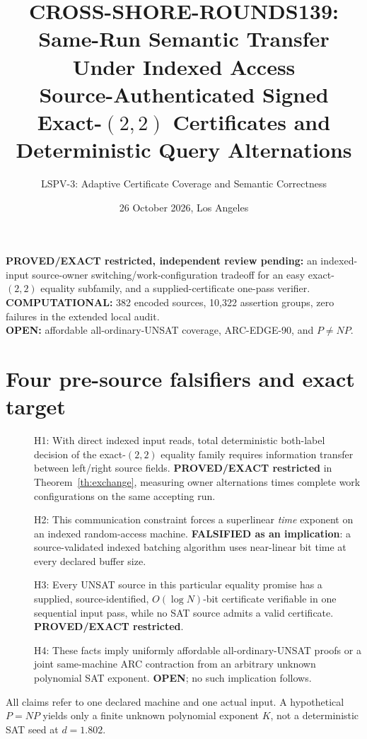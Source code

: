\documentclass[11pt]{article}
\title{CROSS-SHORE-ROUNDS139: Same-Run Semantic Transfer Under Indexed Access\\
\large Source-Authenticated Signed Exact-$(2,2)$ Certificates and Deterministic Query Alternations}
\author{LSPV-3: Adaptive Certificate Coverage and Semantic Correctness}
\date{26 October 2026, Los Angeles}
\begin{document}
\maketitle
\begin{center}
\textbf{PROVED/EXACT restricted, independent review pending:} an indexed-input source-owner switching/work-configuration tradeoff for an easy exact-$(2,2)$ equality subfamily, and a supplied-certificate one-pass verifier.\\
\textbf{COMPUTATIONAL:} 382 encoded sources, 10,322 assertion groups, zero failures in the extended local audit.\\
\textbf{OPEN:} affordable all-ordinary-UNSAT coverage, ARC-EDGE-90, and $P\ne NP$.
\end{center}
\section{Four pre-source falsifiers and exact target}
\begin{description}
\item[] H1: With direct indexed input reads, total deterministic both-label decision of the exact-$(2,2)$ equality family requires information transfer between left/right source fields. \textbf{PROVED/EXACT restricted} in Theorem~\ref{th:exchange}, measuring owner alternations times complete work configurations on the same accepting run.
\item[] H2: This communication constraint forces a superlinear \emph{time} exponent on an indexed random-access machine. \textbf{FALSIFIED as an implication}: a source-validated indexed batching algorithm uses near-linear bit time at every declared buffer size.
\item[] H3: Every UNSAT source in this particular equality promise has a supplied, source-identified, $O(\log N)$-bit certificate verifiable in one sequential input pass, while no SAT source admits a valid certificate. \textbf{PROVED/EXACT restricted}.
\item[] H4: These facts imply uniformly affordable all-ordinary-UNSAT proofs or a joint same-machine ARC contraction from an arbitrary unknown polynomial SAT exponent. \textbf{OPEN}; no such implication follows.
\end{description}
All claims refer to one declared machine and one actual input. A hypothetical $P=NP$ yields only a finite unknown polynomial exponent $K$, not a deterministic SAT seed at $d=1.802$.
\end{document}
